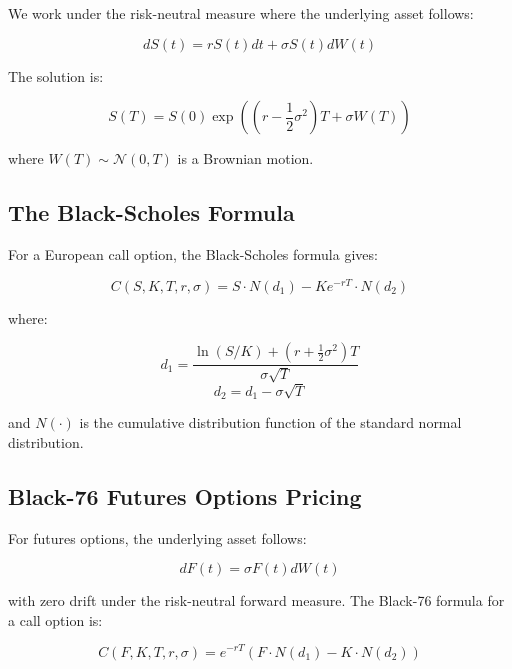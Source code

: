 \documentclass[12pt]{article}
\begin{document}
We work under the risk-neutral measure where the underlying asset follows:

\begin{equation}
dS(t) = rS(t)dt + \sigma S(t)dW(t)
\end{equation}

The solution is:

\begin{equation}
S(T) = S(0)\exp\left((r - \frac{1}{2}\sigma^2)T + \sigma W(T)\right)
\end{equation}

where $W(T) \sim \mathcal{N}(0, T)$ is a Brownian motion.

\subsection{The Black-Scholes Formula}

For a European call option, the Black-Scholes formula gives:

\begin{equation}
C(S, K, T, r, \sigma) = S \cdot N(d_1) - K e^{-rT} \cdot N(d_2)
\end{equation}

where:

\begin{equation}
d_1 = \frac{\ln(S/K) + (r + \frac{1}{2}\sigma^2)T}{\sigma\sqrt{T}}
\end{equation}
\begin{equation}
d_2 = d_1 - \sigma\sqrt{T}
\end{equation}

and $N(\cdot)$ is the cumulative distribution function of the standard normal distribution.

\subsection{Black-76 Futures Options Pricing}

For futures options, the underlying asset follows:

\begin{equation}
dF(t) = \sigma F(t)dW(t)
\end{equation}

with zero drift under the risk-neutral forward measure. The Black-76 formula for a call option is:

\begin{equation}
C(F, K, T, r, \sigma) = e^{-rT} \left(F \cdot N(d_1) - K \cdot N(d_2)\right)
\end{equation}
\end{document}

